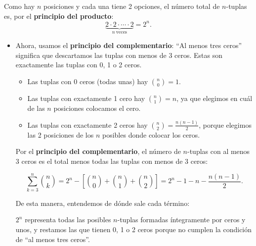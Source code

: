 \documentclass[a4paper,12pt]{article}
\begin{document}
\begin{ejercicio}[title=Ejercicio 16]
Como hay $n$ posiciones y cada una tiene 2 opciones, el número total de $n$-tuplas es, por el \textbf{principio del producto}:
\[
\underbrace{2 \cdot 2 \cdot \cdots \cdot 2}_{n\ \text{veces}} = 2^n.
\]
\begin{itemize}  
\item Ahora, usamos el \textbf{principio del complementario}: “Al menos tres ceros” significa que descartamos las tuplas con menos de 3 ceros.  
Estas son exactamente las tuplas con 0, 1 o 2 ceros.

\begin{itemize}

\item Las tuplas con 0 ceros (todas unas) hay $\binom{n}{0} = 1$.  

\item Las tuplas con exactamente 1 cero hay $\binom{n}{1} = n$, ya que elegimos en cuál de las $n$ posiciones colocamos el cero.  

\item Las tuplas con exactamente 2 ceros hay $\binom{n}{2} = \frac{n(n-1)}{2}$, porque elegimos las 2 posiciones de los $n$ posibles donde colocar los ceros.

\end{itemize}

\vspace{0.5em}

Por el \textbf{principio del complementario}, el número de $n$-tuplas con al menos 3 ceros es el total menos todas las tuplas con menos de 3 ceros:

\[
\sum_{k=3}^{n} \binom{n}{k} = 2^n - \left[ \binom{n}{0} + \binom{n}{1} + \binom{n}{2} \right] 
= \boxed{2^n - 1 - n - \frac{n(n-1)}{2}}.
\]

De esta manera, entendemos de dónde sale cada término:

$2^n$ representa todas las posibles $n$-tuplas formadas íntegramente por ceros y unos, y restamos las que tienen 0, 1 o 2 ceros porque no cumplen la condición de “al menos tres ceros”.

\end{itemize}

\end{ejercicio}
\end{document}
